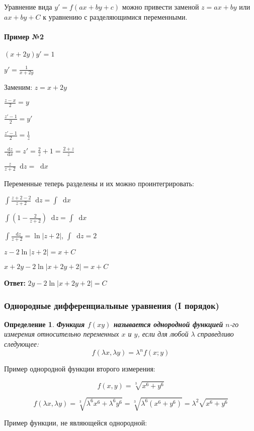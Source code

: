 \documentclass{article}
\newcommand*\diff{\mathop{}\!\mathrm{d}}
\newtheorem{definition}{Определение}
\begin{document}
Уравнение вида $y' = f(ax + by + c)$ можно привести заменой $z = ax + by$ или $ax + by + C$ к уравнению с разделяющимися переменными.

\paragraph{Пример №2}

$(x + 2y) y' = 1$

$y' = \frac{1}{x + 2y}$

Заменим: $z = x + 2y$

$\frac{z - x}{2} = y$

$\frac{z' - 1}{2} = y'$

$\frac{z' - 1}{2} = \frac{1}{z}$

$\frac{\diff z}{\diff x} = z' = \frac{2}{z} + 1 = \frac{2 + z}{z}$

$\frac{z}{z + 2} \diff z = \diff x$

Переменные теперь разделены и их можно проинтегрировать:

$\int \frac{z + 2 - 2}{z + 2} \diff z = \int \diff x$

$\int (1 - \frac{2}{z + 2}) \diff z = \int \diff x$

$\int \frac{\diff z}{z + 2} = \ln |z + 2|$, $\int \diff z = 2$

$z - 2 \ln |z + 2| = x + C$

$x + 2y - 2 \ln |x + 2y + 2| = x + C$

\textbf{Ответ:} $2y - 2 \ln |x + 2y + 2| = C$

\subsubsection{Однородные дифференциальные уравнения (I порядок)}

\begin{definition}
    \textbf{Функция $f(x y)$ называется однородной функцией} $n$-го измерения относительно переменных $x$ и $y$, если для любой $\lambda$ справедливо следующее:
    $$
    f(\lambda x, \lambda y) = \lambda^{n} f(x; y)
    $$
\end{definition}

Пример однородной функции второго измерения:

$$f(x, y) = \sqrt[3]{x^6 + y^6}$$

$$f(\lambda x, \lambda y) = \sqrt[3]{\lambda^6 x^6 + \lambda^6 y^6} = \sqrt[3]{\lambda^6 (x^6 + y^6)} = \lambda^2 \sqrt{x^6 + y^6}$$

Пример функции, не являющейся однородной:
\end{document}
